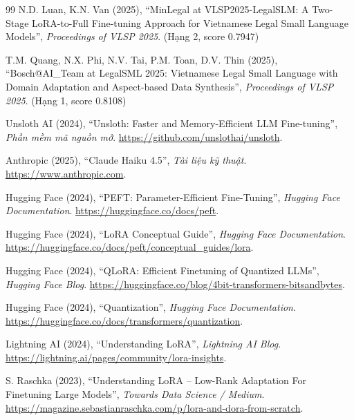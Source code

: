 \begin{thebibliography}{99}
N.D. Luan, K.N. Van (2025),
``MinLegal at VLSP2025-LegalSLM: A Two-Stage LoRA-to-Full Fine-tuning
Approach for Vietnamese Legal Small Language Models'',
\textit{Proceedings of VLSP 2025}. (Hạng 2, score 0.7947)

T.M. Quang, N.X. Phi, N.V. Tai, P.M. Toan, D.V. Thin (2025),
``Bosch@AI\_Team at LegalSML 2025: Vietnamese Legal Small Language
with Domain Adaptation and Aspect-based Data Synthesis'',
\textit{Proceedings of VLSP 2025}. (Hạng 1, score 0.8108)

Unsloth AI (2024),
``Unsloth: Faster and Memory-Efficient LLM Fine-tuning'',
\textit{Phần mềm mã nguồn mở}. \url{https://github.com/unslothai/unsloth}.

Anthropic (2025),
``Claude Haiku 4.5'',
\textit{Tài liệu kỹ thuật}. \url{https://www.anthropic.com}.

Hugging Face (2024),
``PEFT: Parameter-Efficient Fine-Tuning'',
\textit{Hugging Face Documentation}.
\url{https://huggingface.co/docs/peft}.

Hugging Face (2024),
``LoRA Conceptual Guide'',
\textit{Hugging Face Documentation}.
\url{https://huggingface.co/docs/peft/conceptual_guides/lora}.

Hugging Face (2024),
``QLoRA: Efficient Finetuning of Quantized LLMs'',
\textit{Hugging Face Blog}.
\url{https://huggingface.co/blog/4bit-transformers-bitsandbytes}.

Hugging Face (2024),
``Quantization'',
\textit{Hugging Face Documentation}.
\url{https://huggingface.co/docs/transformers/quantization}.

Lightning AI (2024),
``Understanding LoRA'',
\textit{Lightning AI Blog}.
\url{https://lightning.ai/pages/community/lora-insights}.

S. Raschka (2023),
``Understanding LoRA -- Low-Rank Adaptation For Finetuning Large Models'',
\textit{Towards Data Science / Medium}.
\url{https://magazine.sebastianraschka.com/p/lora-and-dora-from-scratch}.

\end{thebibliography}
